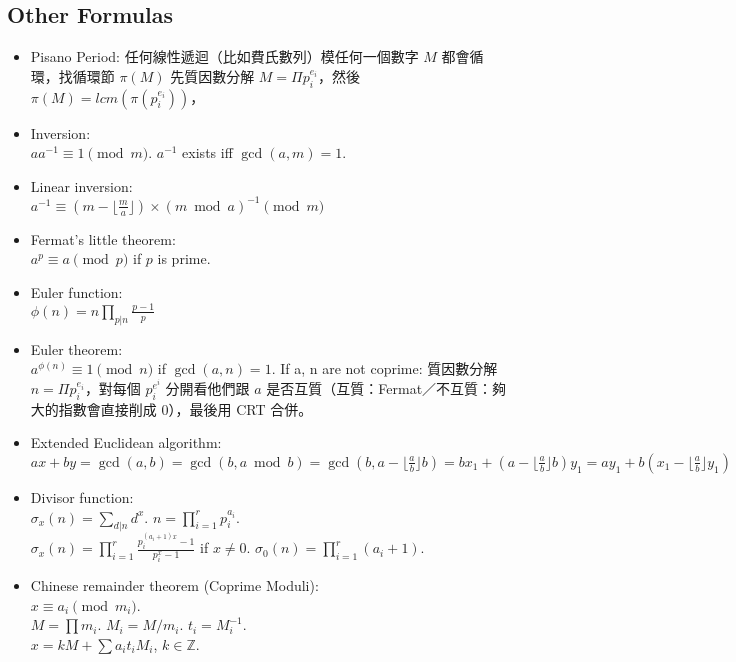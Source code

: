 \documentclass[a4paper,10pt,twocolumn,oneside]{article}
\begin{document}
\subsection{Other Formulas}
{\normalsize \begin{itemize}
    \item Pisano Period: 任何線性遞迴（比如費氏數列）模任何一個數字 $M$ 都會循環，找循環節 $\pi(M)$ 先質因數分解 $M = \Pi p_i^{e_i}$，然後 $\pi(M) = lcm(\pi(p_i^{e_i}))$，

    \item Inversion:\\ $aa^{-1} \equiv 1 \pmod{m}$. $a^{-1}$ exists iff $\gcd(a,m)=1$.
    
    \item Linear inversion:\\ $a^{-1} \equiv (m - \lfloor\frac{m}{a}\rfloor) \times (m \bmod a)^{-1} \pmod{m}$
    
    \item Fermat's little theorem:\\ $a^p \equiv a \pmod{p}$ if $p$ is prime.
    
    \item Euler function:\\ $\phi(n)=n \prod_{p|n} \frac{p-1}{p}$
    
    \item Euler theorem:\\ $a^{\phi(n)} \equiv 1 \pmod{n}$ if $\gcd(a,n) = 1$.  If a, n are not coprime: 質因數分解 $n = \Pi p_i^{e_i}$，對每個 $p_i^{e^i}$ 分開看他們跟 $a$ 是否互質（互質：Fermat／不互質：夠大的指數會直接削成 $0$），最後用 CRT 合併。
    
    \item Extended Euclidean algorithm:\\
    $ax+by=\gcd(a,b)=\gcd(b, a \bmod b)=\gcd(b, a-\lfloor\frac{a}{b}\rfloor b)=bx_1+(a-\lfloor\frac{a}{b}\rfloor b)y_1=ay_1+b(x_1-\lfloor\frac{a}{b}\rfloor y_1)$
    
    \item Divisor function:\\ $\sigma_x(n) = \sum_{d|n}d^x$. $n=\prod_{i=1}^r p_i^{a_i}$.\\ $\sigma_x(n)=\prod_{i=1}^r \frac{p_i^{(a_i+1)x}-1}{p_i^x-1}$ if $x \neq 0$. $\sigma_0(n)=\prod_{i=1}^r (a_i+1)$.
    
    \item Chinese remainder theorem (Coprime Moduli):\\ $x \equiv a_i \pmod{m_i}$.\\
        $M=\prod m_i$. $M_i=M/m_i$. $t_i=M_i^{-1}$.\\
        $x = kM + \sum a_i t_i M_i$, $k \in \mathbb{Z}$.
        

\end{itemize}}
\end{document}
